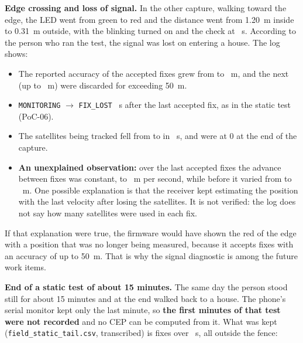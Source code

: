 \textbf{Edge crossing and loss of signal.} In the other capture, walking toward the edge, the LED went from
green to red and the distance went from 1.20~m inside to 0.31~m outside, with the blinking turned on and the
check at \dCrossCheckOutUs~\textmu s. According to the person who ran the test, the signal was lost on entering a
house. The log shows:

\begin{itemize}
  \item The reported accuracy of the \dCrossFixes{} accepted fixes grew from \dCrossAccFrom{} to \dCrossAccTo~m, and the
        next \dCrossIgnored{} (up to \dCrossIgnoredLast~m) were discarded for exceeding 50~m.
  \item \texttt{MONITORING} $\to$ \texttt{FIX\_LOST} \dCrossLostS~s after the last accepted fix, as in the static
        test (PoC-06).
  \item The satellites being tracked fell from \dCrossSatsFrom{} to \dCrossSatsTo{} in \dCrossSatsSeconds~s, and
        were at 0 at the end of the capture.
  \item \textbf{An unexplained observation:} over the last \dCrossConstSteps{} accepted fixes the advance between
        fixes was constant, \dCrossConstLow{} to \dCrossConstHigh~m per second, while before it varied from
        \dCrossVarLow{} to \dCrossVarHigh~m. One possible explanation is that the receiver kept estimating the
        position with the last velocity after losing the satellites. It is not verified: the log does not say
        how many satellites were used in each fix.
\end{itemize}

If that explanation were true, the firmware would have shown the red of the edge with a position that was no
longer being measured, because it accepts fixes with an accuracy of up to 50~m. That is why the signal diagnostic
is among the future work items.

\textbf{End of a static test of about 15 minutes.} The same day the person stood still for about 15 minutes and at the
end walked back to a house. The phone's serial monitor kept only the last minute, so \textbf{the first minutes
of that test were not recorded} and no CEP can be computed from it. What was kept (\texttt{field\_\allowbreak static\_\allowbreak tail.csv}, transcribed) is
\dTailFixes{} fixes over \dTailSpanS~s, all outside the fence:

